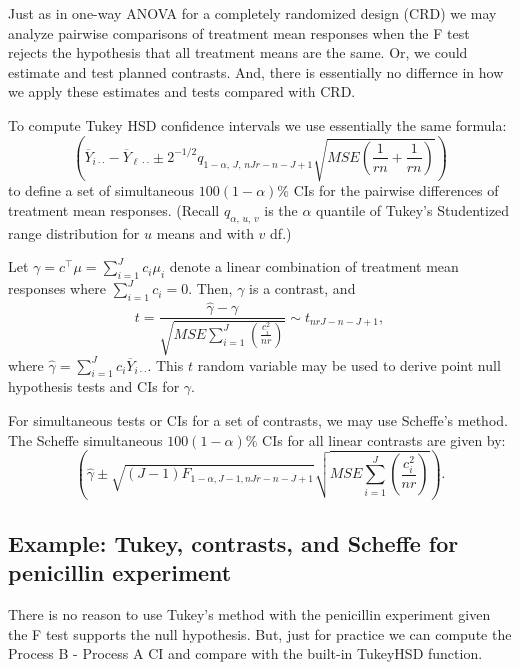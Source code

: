 \documentclass[
]{book}
\begin{document}
Just as in one-way ANOVA for a completely randomized design (CRD) we may analyze pairwise comparisons of treatment mean responses when the F test rejects the hypothesis that all treatment means are the same. Or, we could estimate and test planned contrasts. And, there is essentially no differnce in how we apply these estimates and tests compared with CRD.

To compute Tukey HSD confidence intervals we use essentially the same formula:
\[\left(\overline Y_{i\cdot \cdot} - \overline Y_{\ell \cdot \cdot} \pm 2^{-1/2}q_{1-\alpha, \,J, \,nJr - n- J +1}\sqrt{MSE\left(\frac{1}{rn} + \frac{1}{rn}\right)}\right)\]
to define a set of simultaneous \(100(1-\alpha)\%\) CIs for the pairwise differences of treatment mean responses. (Recall \(q_{\alpha, \,u, \,v}\) is the \(\alpha\) quantile of Tukey's Studentized range distribution for \(u\) means and with \(v\) df.)

Let \(\gamma = c^\top \mu = \sum_{i=1}^J c_i \mu_i\) denote a linear combination of treatment mean responses where \(\sum_{i=1}^J c_i = 0\). Then, \(\gamma\) is a contrast, and
\[t = \frac{\hat\gamma - \gamma}{\sqrt{MSE\sum_{i=1}^J \left(\frac{c_i^2}{nr}\right)}}\sim t_{nrJ - n-J+1},\]
where \(\hat\gamma = \sum_{i=1}^J c_i \overline Y_{i\cdot\cdot}\). This \(t\) random variable may be used to derive point null hypothesis tests and CIs for \(\gamma\).

For simultaneous tests or CIs for a set of contrasts, we may use Scheff\textquotesingle e's method. The Scheff\textquotesingle e simultaneous \(100(1-\alpha)\%\) CIs for all linear contrasts are given by:
\[\left(\hat\gamma \pm \sqrt{(J-1)F_{1-\alpha, J-1, nJr-n-J+1}}\sqrt{MSE\sum_{i=1}^J \left(\frac{c_i^2}{nr}\right)}\right).\]

\hypertarget{example-tukey-contrasts-and-scheffe-for-penicillin-experiment}{%
\subsection{Example: Tukey, contrasts, and Scheffe for penicillin experiment}\label{example-tukey-contrasts-and-scheffe-for-penicillin-experiment}}

There is no reason to use Tukey's method with the penicillin experiment given the F test supports the null hypothesis. But, just for practice we can compute the Process B - Process A CI and compare with the built-in TukeyHSD function.
\end{document}
